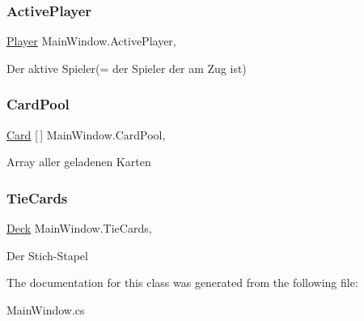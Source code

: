 \subsubsection{\texorpdfstring{Active\+Player}{ActivePlayer}}
{\footnotesize\ttfamily \mbox{\hyperlink{class_poke_quet_1_1_player}{Player}} Main\+Window.\+Active\+Player\hspace{0.3cm}{\ttfamily [get]}, {\ttfamily [set]}}



Der aktive Spieler(= der Spieler der am Zug ist) 

\mbox{\label{class_main_window_ae1c30b48118e2c8c6cd16171fab0cd31}} 
\subsubsection{\texorpdfstring{Card\+Pool}{CardPool}}
{\footnotesize\ttfamily \mbox{\hyperlink{class_poke_quet_1_1_card}{Card}} \mbox{[}$\,$\mbox{]} Main\+Window.\+Card\+Pool\hspace{0.3cm}{\ttfamily [get]}, {\ttfamily [set]}}



Array aller geladenen Karten 

\mbox{\label{class_main_window_a71f4eaa448a91297c8c54786e5c0516e}} 
\subsubsection{\texorpdfstring{Tie\+Cards}{TieCards}}
{\footnotesize\ttfamily \mbox{\hyperlink{class_poke_quet_1_1_deck}{Deck}} Main\+Window.\+Tie\+Cards\hspace{0.3cm}{\ttfamily [get]}, {\ttfamily [set]}}



Der Stich-\/\+Stapel 



The documentation for this class was generated from the following file\+:\begin{DoxyCompactItemize}
\item 
Main\+Window.\+cs\end{DoxyCompactItemize}
